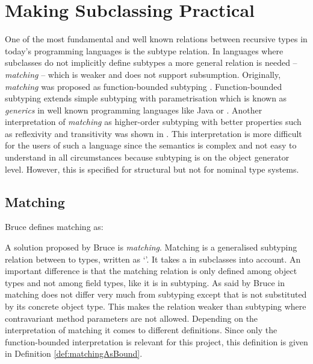\section{Making Subclassing Practical}
\label{ctr:makingSubclassingPractical}
One of the most fundamental and well known relations between recursive
types in today's programming languages is the subtype relation.
In languages where subclasses do not implicitly define subtypes a
more general relation is needed -- \emph{matching} -- which is weaker
and does not support subsumption. Originally, \emph{matching} was
proposed as function-bounded subtyping \cite{canning_f-bounded_1989}. Function-bounded
subtyping extends simple subtyping with parametrisation which
is known as \emph{generics} in well known programming languages
like Java or \cs \cite{barron-estrada_inheritance_2003}. Another
interpretation of \emph{matching} as higher-order subtyping with
better properties such as reflexivity and transitivity was shown in
\cite{abadi_subtyping_1996}. This interpretation is more difficult for
the users of such a language since the semantics is complex and not easy
to understand in all circumstances because subtyping is on the object
generator level. However, this is specified for structural but not for
nominal type systems.

\subsection{Matching}
\label{subsec:matching}
\begin{prop}[Matching]
	\label{prop:matching}
	Bruce defines matching as:
\end{prop}

A solution proposed by Bruce \cite{bruce_binary_1995} is
\emph{matching}. Matching is a generalised subtyping relation between to
types, written as `\match'. It takes a \mytype in subclasses into account.
An important difference is that the matching relation is only defined
among object types and not among field types, like it is in subtyping. As
said by Bruce in \cite{bruce_foundations_2002} matching does not differ
very much from subtyping except that \mytype is not substituted by its
concrete object type. This makes the relation weaker than subtyping
where contravariant method parameters are not allowed. Depending on the
interpretation of matching it comes to different definitions. Since
only the function-bounded interpretation is relevant for this project, this
definition is given in Definition \ref{def:matchingAsBound}.

